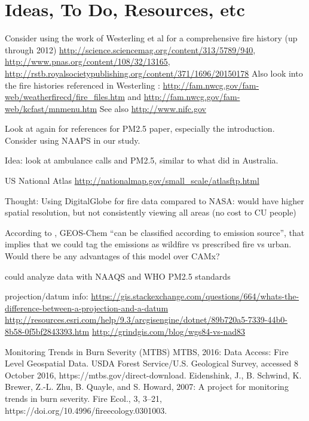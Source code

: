 \section{Ideas, To Do, Resources, etc}

Consider using the work of Westerling et al for a comprehensive fire history (up through 2012) \url{http://science.sciencemag.org/content/313/5789/940}, \url{http://www.pnas.org/content/108/32/13165}, \url{http://rstb.royalsocietypublishing.org/content/371/1696/20150178} \cite{westerling_increasing_2016,WesterlingCorrection2016} Also look into the fire histories referenced in Westerling \cite{westerling_increasing_2016,WesterlingCorrection2016}: \url{http://fam.nwcg.gov/fam-web/weatherfirecd/fire_files.htm} and \url{http://fam.nwcg.gov/fam-web/kcfast/mnmenu.htm} See also \url{http://www.nifc.gov}

Look at \cite{kollanus_effects_2016} again for references for PM2.5 paper, especially the introduction. Consider using NAAPS in our study. 

Idea: look at ambulance calls and PM2.5, similar to what \cite{salimi_ambient_2016} did in Australia.

US National Atlas \url{http://nationalmap.gov/small_scale/atlasftp.html}

Thought: Using DigitalGlobe for fire data compared to NASA: would have higher spatial resolution, but not consistently viewing all areas (no cost to CU people) 


According to \cite{liu_particulate_2016}, GEOS-Chem ``can be classified according to emission source'', that implies that we could tag the emissions as wildfire vs prescribed fire vs urban. Would there be any advantages of this model over CAMx?

could analyze data with NAAQS and WHO PM2.5 standards

projection/datum info: \url{https://gis.stackexchange.com/questions/664/whats-the-difference-between-a-projection-and-a-datum}
\url{http://resources.esri.com/help/9.3/arcgisengine/dotnet/89b720a5-7339-44b0-8b58-0f5bf2843393.htm}
\url{http://grindgis.com/blog/wgs84-vs-nad83}

Monitoring Trends in Burn Severity (MTBS) MTBS, 2016: Data Access: Fire Level Geospatial Data. USDA Forest Service/U.S. Geological Survey, accessed 8 October 2016, https://mtbs.gov/direct-download. 
Eidenshink, J., B. Schwind, K. Brewer, Z.-L. Zhu, B. Quayle, and S. Howard, 2007: A project for monitoring trends in burn severity. Fire Ecol., 3, 3–21, https://doi.org/10.4996/fireecology.0301003. 

